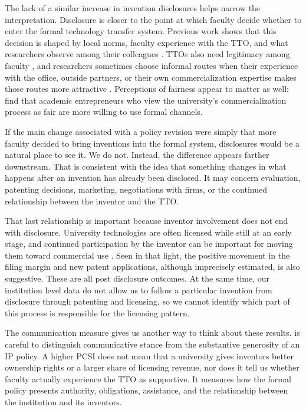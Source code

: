 The lack of a similar increase in invention disclosures helps narrow the interpretation. Disclosure is closer to the point at which faculty decide whether to enter the formal technology transfer system. Previous work shows that this decision is shaped by local norms, faculty experience with the TTO, and what researchers observe among their colleagues \citep{OwenSmithPowell2001,BercovitzFeldman2008}. TTOs also need legitimacy among faculty \citep{OKaneEtAl2015}, and researchers sometimes choose informal routes when their experience with the office, outside partners, or their own commercialization expertise makes those routes more attractive \citep{HalilemDiop2025}. Perceptions of fairness appear to matter as well: \citet{WaldmanEtAl2022} find that academic entrepreneurs who view the university's commercialization process as fair are more willing to use formal channels.

If the main change associated with a policy revision were simply that more faculty decided to bring inventions into the formal system, disclosures would be a natural place to see it. We do not. Instead, the difference appears farther downstream. That is consistent with the idea that something changes in what happens after an invention has already been disclosed. It may concern evaluation, patenting decisions, marketing, negotiations with firms, or the continued relationship between the inventor and the TTO.

That last relationship is important because inventor involvement does not end with disclosure. University technologies are often licensed while still at an early stage, and continued participation by the inventor can be important for moving them toward commercial use \citep{JensenThursby2001}. Seen in that light, the positive movement in the filing margin and new patent applications, although imprecisely estimated, is also suggestive. These are all post disclosure outcomes. At the same time, our institution level data do not allow us to follow a particular invention from disclosure through patenting and licensing, so we cannot identify which part of this process is responsible for the licensing pattern.

The communication measure gives us another way to think about these results. \citet{SharmaPCSI2026} is careful to distinguish communicative stance from the substantive generosity of an IP policy. A higher PCSI does not mean that a university gives inventors better ownership rights or a larger share of licensing revenue, nor does it tell us whether faculty actually experience the TTO as supportive. It measures how the formal policy presents authority, obligations, assistance, and the relationship between the institution and its inventors.

